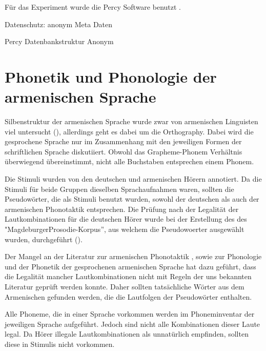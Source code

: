 \documentclass[11pt,a4paper,headsepline,twoside,toc=bibliography]{scrreprt}
\begin{document}
Für das Experiment wurde die Percy Software benutzt \autocite{Draxler2011, Draxler2014}. 



Datenschutz: anonym
Meta Daten


Percy
Datenbankstruktur
Anonym


\section{Phonetik und Phonologie der armenischen Sprache}
\label{armenian_phonology}

Silbenstruktur der armenischen Sprache wurde zwar von armenischen Linguisten viel untersucht (), allerdings geht es dabei um die Orthography. Dabei wird die gesprochene Sprache nur im Zusammenhang mit den jeweiligen Formen der schriftlichen Sprache diskutiiert. Obwohl das Grapheme-Phonem Verhältnis überwiegend übereinstimmt, nicht alle Buchstaben entsprechen einem Phonem. 

Die Stimuli wurden von den deutschen und armenischen Hörern annotiert. Da die Stimuli für beide Gruppen dieselben Sprachaufnahmen waren, sollten die Pseudowörter, die als Stimuli benutzt wurden, sowohl der deutschen als auch der armenischen Phonotaktik entsprechen. Die Prüfung nach der Legalität der Lautkombinationen für die deutschen Hörer wurde bei der Erstellung des des "MagdeburgerProsodie-Korpus”, aus welchem die Pseudowoerter ausgewählt wurden, durchgeführt (\cite{Wendt2002}). \\



Der Mangel an der Literatur zur armenischen Phonotaktik , sowie zur Phonologie und der Phonetik der gesprochenen armenischen Sprache hat dazu geführt, dass die Legalität mancher Lautkombinationen nicht mit Regeln der uns bekannten Literatur geprüft werden konnte. Daher sollten tatsächliche Wörter aus dem Armenischen gefunden werden, die die Lautfolgen der Pseudowörter enthalten. 


Alle Phoneme, die in einer Sprache vorkommen werden im Phoneminventar der jeweiligen Sprache aufgeführt. Jedoch sind nicht alle Kombinationen dieser Laute legal. Da Hörer illegale Lautkombinationen als unnatürlich empfinden,  sollten diese in Stimulis nicht vorkommen.\\
\end{document}
